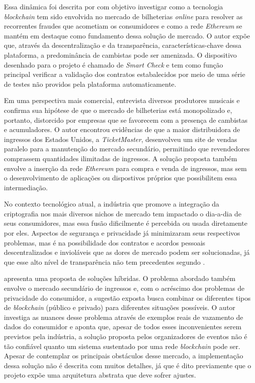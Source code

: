 {Essa dinâmica foi descrita por  com objetivo investigar como a tecnologia \textit{blockchain} tem sido envolvida no mercado de bilheterias \textit{online} para resolver as recorrentes fraudes que acometiam os consumidores e como a rede \textit{Ethereum} se mantém em destaque como fundamento dessa solução de mercado. O autor expõe que, através da descentralização e da transparência, características-chave dessa plataforma, a predominância de cambistas pode ser amenizada. O dispositivo desenhado para o projeto é chamado de \textit{Smart Check} e tem como função principal verificar a validação dos contratos estabalecidos por meio de uma série de testes não providos pela plataforma automaticamente.

Em uma perspectiva mais comercial,  entrevista diversos produtores musicais e confirma sua hipótese de que o mercado de bilheterias está monopolizado e, portanto, distorcido por empresas que se favorecem com a presença de cambistas e acumuladores. O autor encontrou evidências de que a maior distribuidora de ingressos dos Estados Unidos, a \textit{TicketMaster}, desenvolveu um site de vendas paralelo para a manutenção do mercado secundário, permitindo que revendedores comprassem quantidades ilimitadas de ingressos. A solução proposta também envolve a inserção da rede \textit{Ethereum} para compra e venda de ingressos, mas sem o desenvolvimento de aplicações ou dispostivos próprios que possibilitem essa intermediação.

No contexto tecnológico atual, a indústria que promove a integração da criptografia nos mais diversos nichos de mercado tem impactado o dia-a-dia de seus consumidores, mas essa fusão dificilmente é percebida ou usada diretamente por eles. Aspectos de segurança e privacidade já minimizaram seus respectivos problemas, mas é na possibilidade dos contratos e acordos pessoais descentralizados e invioláveis que as dores de mercado podem ser solucionadas, já que esse alto nível de transparência não tem precedentes segundo   .

 apresenta uma proposta de soluções híbridas. O problema abordado também envolve o mercado secundário de ingressos e, com o acréscimo dos problemas de privacidade do consumidor, a sugestão exposta busca combinar os diferentes tipos de \textit{blockchain} (público e privado) para diferentes situações possíveis. O autor investiga as nuances desse problema através de exemplos reais de vazamento de dados do consumidor e aponta que, apesar de todos esses inconvenientes serem previstos pela indústria, a solução proposta pelos organizadores de eventos não é tão confiável quanto um sistema sustentado por uma rede \textit{blockchain} pode ser. Apesar de contemplar os principais obstáculos desse mercado, a implementação dessa solução não é descrita com muitos detalhes, já que é dito previamente que o projeto expõe uma arquitetura abstrata que deve sofrer ajustes.

}
